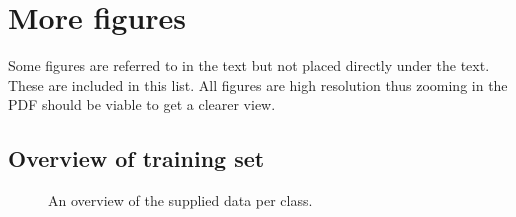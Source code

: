 \chapter*{More figures}

Some figures are referred to in the text but not placed directly under the text. These are included in this list. All figures are high resolution thus zooming in the PDF should be viable to get a clearer view.


\section*{Overview of training set}

\begin{figure}[H]
    \begin{center}
    \end{center}
    \captionsetup{width=0.65\linewidth}
    \captionsetup{justification=centering}
    \caption{An overview of the supplied data per class.}
    \label{fig:1-data_analysis-labeled_data_overview.png}
\end{figure}